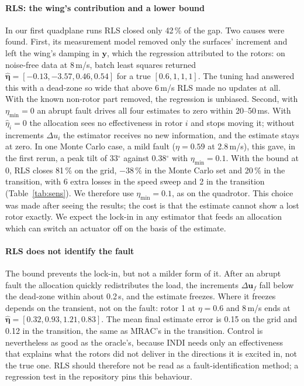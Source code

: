 \documentclass[preprint,12pt,a4paper]{elsarticle}
\newcommand{\vect}[1]{\bm{#1}}
\begin{document}
\paragraph{RLS: the wing's contribution and a lower bound} In our first quadplane runs RLS closed only 42\,\% of the gap. Two causes were
found. First, its measurement model removed only the surfaces' increment and left the wing's damping in $\vect y$, which the regression
attributed to the rotors: on noise-free data at 8\,m/s, batch least squares returned $\hat{\vect\eta} = [-0.13, -3.57, 0.46, 0.54]$ for a true
$[0.6, 1, 1, 1]$. The tuning had answered this with a dead-zone so wide that above 6\,m/s RLS made no updates at all. With the known non-rotor
part removed, the regression is unbiased. Second, with $\eta_{\min} = 0$ an abrupt fault drives all four estimates to zero within
20--50\,ms. With $\hat\eta_i = 0$ the allocation sees no effectiveness in rotor $i$ and stops moving it; without increments $\Delta u_i$ the
estimator receives no new information, and the estimate stays at zero. In one Monte Carlo case, a mild fault ($\eta = 0.59$ at 2.8\,m/s),
this gave, in the first rerun, a peak tilt of 33$^\circ$ against 0.38$^\circ$ with $\eta_{\min} = 0.1$. With the bound at 0, RLS closes 81\,\% on the grid,
$-38$\,\% in the Monte Carlo set and 20\,\% in the transition, with 6 extra losses in the speed sweep and 2 in the transition
(Table~\ref{tab:sens}). We therefore use $\eta_{\min} = 0.1$, as on the quadrotor. This choice was made after seeing the results; the cost
is that the estimate cannot show a lost rotor exactly. We expect the lock-in in any estimator that feeds an allocation which can switch an
actuator off on the basis of the estimate.

\paragraph{RLS does not identify the fault} The bound prevents the lock-in, but not a milder form of it. After an abrupt fault the
allocation quickly redistributes the load, the increments $\Delta\vect u_f$ fall below the dead-zone within about 0.2\,s, and the estimate
freezes. Where it freezes depends on the transient, not on the fault: rotor 1 at $\eta = 0.6$ and 8\,m/s ends at
$\hat{\vect\eta} = [0.32, 0.93, 1.21, 0.83]$. The mean final estimate error is 0.15 on the grid and 0.12 in the transition, the same as
MRAC's in the transition. Control is nevertheless as good as the oracle's, because INDI needs only an effectiveness that explains what the
rotors did not deliver in the directions it is excited in, not the true one. RLS should therefore not be read as a fault-identification
method; a regression test in the repository pins this behaviour.
\end{document}
